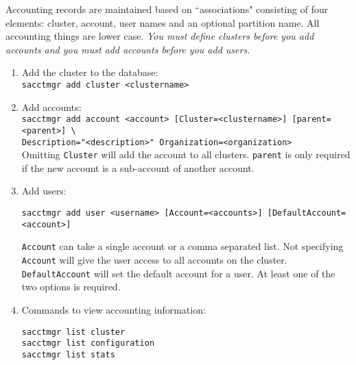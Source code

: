 \begin{enumerate}
    Accounting records are maintained based on ``associations" consisting of four elements: cluster, account, user names and an optional partition name. All accounting things are lower case. \emph{You must define clusters before you add accounts and you must add accounts before you add users.}

    \begin{enumerate}
      \item Add the cluster to the database: \\
        \texttt{sacctmgr add cluster <clustername>}

      \item Add accounts: \\	
        \texttt{sacctmgr add account <account> [Cluster=<clustername>] [parent=<parent>] \textbackslash{}}\\ 
        \texttt{Description="<description>" Organization=<organization>} \\
        Omitting \texttt{Cluster} will add the account to all clusters. \texttt{parent} is only required if the new account is a sub-account of another account.

%		

      \item Add users: 

        \texttt{sacctmgr add user <username> [Account=<accounts>] [DefaultAccount=<account>]}


        \texttt{Account} can take a single account or a comma separated list. Not specifying \texttt{Account} will give the user access to all accounts on the cluster. \texttt{DefaultAccount} will set the default account for a user. At least one of the two options is required. \\

%        

      \item Commands to view accounting information:

        \texttt{sacctmgr list cluster} \\
        \texttt{sacctmgr list configuration} \\
        \texttt{sacctmgr list stats}
	
    \end{enumerate}


\end{enumerate}
